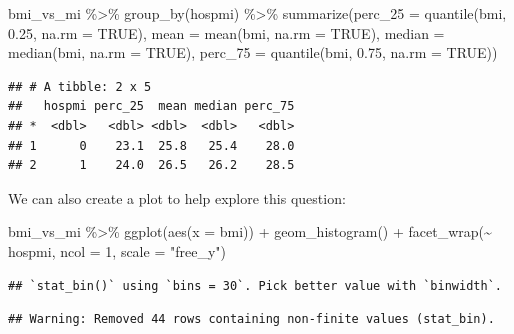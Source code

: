 \documentclass[
]{book}
\newenvironment{Shaded}{\begin{snugshade}}{\end{snugshade}}
\newcommand{\AttributeTok}[1]{\textcolor[rgb]{0.77,0.63,0.00}{#1}}
\newcommand{\ConstantTok}[1]{\textcolor[rgb]{0.00,0.00,0.00}{#1}}
\newcommand{\DecValTok}[1]{\textcolor[rgb]{0.00,0.00,0.81}{#1}}
\newcommand{\FloatTok}[1]{\textcolor[rgb]{0.00,0.00,0.81}{#1}}
\newcommand{\FunctionTok}[1]{\textcolor[rgb]{0.00,0.00,0.00}{#1}}
\newcommand{\NormalTok}[1]{#1}
\newcommand{\SpecialCharTok}[1]{\textcolor[rgb]{0.00,0.00,0.00}{#1}}
\newcommand{\StringTok}[1]{\textcolor[rgb]{0.31,0.60,0.02}{#1}}
\begin{document}
\begin{Shaded}
\begin{Highlighting}[]
\NormalTok{bmi\_vs\_mi }\SpecialCharTok{\%\textgreater{}\%} 
  \FunctionTok{group\_by}\NormalTok{(hospmi) }\SpecialCharTok{\%\textgreater{}\%} 
  \FunctionTok{summarize}\NormalTok{(}\AttributeTok{perc\_25 =} \FunctionTok{quantile}\NormalTok{(bmi, }\FloatTok{0.25}\NormalTok{, }\AttributeTok{na.rm =} \ConstantTok{TRUE}\NormalTok{), }
            \AttributeTok{mean =} \FunctionTok{mean}\NormalTok{(bmi, }\AttributeTok{na.rm =} \ConstantTok{TRUE}\NormalTok{), }
            \AttributeTok{median =} \FunctionTok{median}\NormalTok{(bmi, }\AttributeTok{na.rm =} \ConstantTok{TRUE}\NormalTok{),}
            \AttributeTok{perc\_75 =} \FunctionTok{quantile}\NormalTok{(bmi, }\FloatTok{0.75}\NormalTok{, }\AttributeTok{na.rm =} \ConstantTok{TRUE}\NormalTok{))}
\end{Highlighting}
\end{Shaded}

\begin{verbatim}
## # A tibble: 2 x 5
##   hospmi perc_25  mean median perc_75
## *  <dbl>   <dbl> <dbl>  <dbl>   <dbl>
## 1      0    23.1  25.8   25.4    28.0
## 2      1    24.0  26.5   26.2    28.5
\end{verbatim}

We can also create a plot to help explore this question:

\begin{Shaded}
\begin{Highlighting}[]
\NormalTok{bmi\_vs\_mi }\SpecialCharTok{\%\textgreater{}\%} 
  \FunctionTok{ggplot}\NormalTok{(}\FunctionTok{aes}\NormalTok{(}\AttributeTok{x =}\NormalTok{ bmi)) }\SpecialCharTok{+} 
  \FunctionTok{geom\_histogram}\NormalTok{() }\SpecialCharTok{+} 
  \FunctionTok{facet\_wrap}\NormalTok{(}\SpecialCharTok{\textasciitilde{}}\NormalTok{ hospmi, }\AttributeTok{ncol =} \DecValTok{1}\NormalTok{, }\AttributeTok{scale =} \StringTok{"free\_y"}\NormalTok{)}
\end{Highlighting}
\end{Shaded}

\begin{verbatim}
## `stat_bin()` using `bins = 30`. Pick better value with `binwidth`.
\end{verbatim}

\begin{verbatim}
## Warning: Removed 44 rows containing non-finite values (stat_bin).
\end{verbatim}
\end{document}
